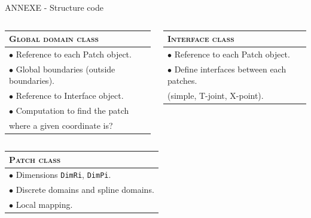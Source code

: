 \documentclass[
	english,%
	logo=false,%
	eurofusion=false, %
	titlegraphic=true, %
	]{ippbeamer}
\begin{document}
\begin{frame}{ANNEXE - Structure code}
\vspace*{0.5cm}
\centering
\scriptsize

\begin{columns}
\begin{column}{0.5\textwidth}
\begin{tabular}{|l|}
	\hline
	\textbf{\textsc{Global domain class}} \\
	\hline
	$\bullet$ Reference to each Patch object.\\
	$\bullet$ Global boundaries (outside boundaries).\\
	$\bullet$ Reference to Interface object.\\
	$\bullet$ Computation to find the patch \\ where a given coordinate is? \\
	\hline
\end{tabular}
\end{column}
\begin{column}{0.5\textwidth}
\begin{tabular}{|l|}
	\hline
	\textbf{\textsc{Interface class}}\\
	\hline
	$\bullet$ Reference to each Patch object.\\
	$\bullet$ Define interfaces between each patches.\\ 
	(simple, T-joint, X-point). \\
	\hline
\end{tabular}
\end{column}
\end{columns}

\vspace*{0.5cm}


\begin{tabular}{|l|}
	\hline
	\textbf{\textsc{Patch class}} \\
	\hline
	$\bullet$ Dimensions \texttt{DimRi}, \texttt{DimPi}. \\
	$\bullet$ Discrete domains and spline domains. \\
	$\bullet$ Local mapping. \\
	\hline
\end{tabular}


\end{frame}
\end{document}
